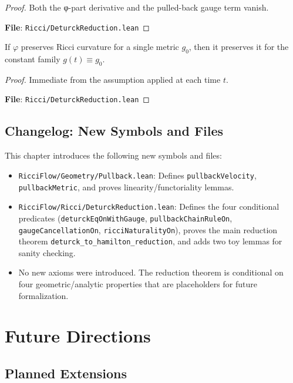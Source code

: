 \begin{proof}
Both the φ-part derivative and the pulled-back gauge term vanish.

\textbf{File}: \texttt{Ricci/DeturckReduction.lean}
\end{proof}

\begin{lemma}
\label{lem:ricciNaturalityOn_const_single}
\leanok
{}
If $\varphi$ preserves Ricci curvature for a single metric $g_0$, then it preserves it for the constant family $g(t) \equiv g_0$.
\end{lemma}

\begin{proof}
\leanok
{}
Immediate from the assumption applied at each time $t$.

\textbf{File}: \texttt{Ricci/DeturckReduction.lean}
\end{proof}

\section{Changelog: New Symbols and Files}

This chapter introduces the following new symbols and files:
\begin{itemize}
\item \texttt{RicciFlow/Geometry/Pullback.lean}: Defines \texttt{pullbackVelocity}, \texttt{pullbackMetric}, and proves linearity/functoriality lemmas.
\item \texttt{RicciFlow/Ricci/DeturckReduction.lean}: Defines the four conditional predicates (\texttt{deturckEqOnWithGauge}, \texttt{pullbackChainRuleOn}, \texttt{gaugeCancellationOn}, \texttt{ricciNaturalityOn}), proves the main reduction theorem \texttt{deturck\_to\_hamilton\_reduction}, and adds two toy lemmas for sanity checking.
\item No new axioms were introduced. The reduction theorem is conditional on four geometric/analytic properties that are placeholders for future formalization.
\end{itemize}

\chapter{Future Directions}

\section{Planned Extensions}

